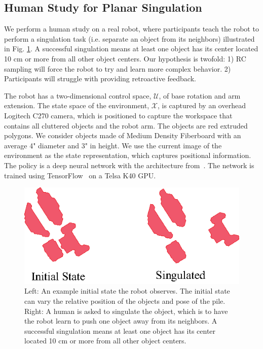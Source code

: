 \documentclass[10pt, conference]{ieeeconf}      %
\begin{document}
\subsection{Human Study for Planar Singulation}
We perform a human study on a real robot, where participants teach the robot to perform a singulation task (i.e. separate an object from its neighbors) illustrated in Fig. \ref{fig:izzy_sing}. A successful singulation means at least one object has its center located 10 cm or more from all other object centers. Our hypothesis is twofold: 1) RC sampling will force the robot to try and learn more complex behavior. 2) Participants will struggle with providing retroactive feedback. 

The robot has a two-dimensional control space, $\mathcal{U}$, of base rotation and arm extension. The state space of the environment, $\mathcal{X}$, is captured by an overhead Logitech C270 camera, which is positioned to capture the workspace that contains all cluttered objects and the robot arm.  The objects are red extruded polygons. We consider objects made of Medium Density Fiberboard with an average 4" diameter and 3" in height.  We use the current image of the environment as the state representation, which captures positional information. The policy is a deep neural network with the architecture from~\cite{laskeyrobot}. The network is trained using TensorFlow~\cite{tensorflow2015-whitepaper} on a Telsa K40 GPU. 

\begin{figure}
\centering
\includegraphics{f_figs/singulation.eps}
\caption{
    \footnotesize
Left: An example initial state the robot observes. The initial state can vary the relative position of the objects and pose of the pile. Right: A human is asked to singulate the object, which is to have the robot learn to push one object away from its neighbors. A successful singulation means at least one object has its center located 10 cm or more from all other object centers.   }

\label{fig:izzy_sing}
\end{figure}
\end{document}
